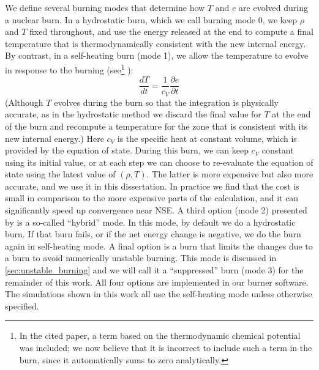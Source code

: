 \documentclass[12pt]{article}
\begin{document}
We define several burning modes that determine how $T$ and $e$ are evolved
during a nuclear burn. In a hydrostatic burn, which we call burning mode 0,
we keep $\rho$ and $T$ fixed throughout, and use
the energy released at the end to compute a final temperature that is
thermodynamically consistent with the new internal energy. By contrast,
in a self-heating burn (mode 1), we allow the temperature to evolve in response
to the burning (see\footnote{In the cited paper, a term based on the
thermodynamic chemical potential was included; we now believe
that it is incorrect to include such a term in the burn, since it
automatically sums to zero analytically.} \citet{maestro3}):
\begin{equation}
  \frac{dT}{dt} = \frac{1}{c_V}\frac{\partial e}{\partial t}
\end{equation}
(Although $T$ evolves during the burn so that the integration is physically
accurate, as in the hydrostatic method we discard the final value
for $T$ at the end of the burn and recompute a temperature for the zone that is
consistent with its new internal energy.) Here $c_V$ is the specific heat at
constant volume, which is provided by the equation of state.  During this burn,
we can keep $c_V$ constant using its initial value, or at each step we
can choose to re-evaluate the equation of state using the latest value of $(\rho, T)$.
The latter is more expensive but also more accurate, and we use it in this dissertation.
In practice we find that the cost is small in comparison to the more expensive
parts of the calculation, and it can significantly speed up convergence near NSE.
A third option (mode 2) presented by \citet{raskin:2010} is a so-called ``hybrid'' mode.
In this mode, by default we do a hydrostatic burn. If that burn fails, or if the net
energy change is negative, we do the burn again in self-heating mode. A final option
is a burn that limits the changes due to a burn to avoid numerically unstable burning.
This mode is discussed in \autoref{sec:unstable_burning} and we will call it a
``suppressed'' burn (mode 3) for the remainder of this work. All four options
are implemented in our burner software. The simulations shown in this work all
use the self-heating mode unless otherwise specified.
\end{document}
